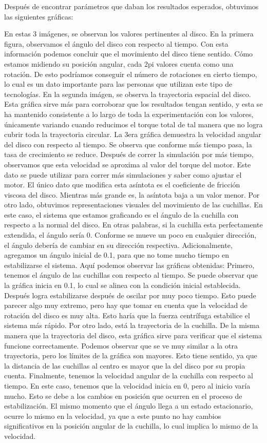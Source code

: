 \documentclass[12pt]{article}
\begin{document}
Después de encontrar parámetros que daban los resultados esperados, obtuvimos las siguientes gráficas:

En estas 3 imágenes, se observan los valores pertinentes al disco. En la primera figura, observamos el ángulo del disco con respecto al tiempo. Con esta información podemos concluir que el movimiento del disco tiene sentido. Cómo estamos midiendo su posición angular, cada 2pi valores cuenta como una rotación. De esto podríamos conseguir el número de rotaciones en cierto tiempo, lo cual es un dato importante para las personas que utilizan este tipo de tecnologías. 
En la segunda imágen, se observa la trayectoria espacial del disco. Esta gráfica sirve más para corroborar que los resultados tengan sentido, y esta se ha mantenido consistente a lo largo de toda la experimentación con los valores, únicamente variando cuando reducimos el torque total de tal manera que no logra cubrir toda la trayectoria circular.
La 3era gráfica demuestra la velocidad angular del disco con respecto al tiempo. Se observa que conforme más tiempo pasa, la tasa de crecimiento se reduce. Después de correr la simulación por más tiempo, observamos que esta velocidad se aproxima al valor del torque del motor. Este dato se puede utilizar para correr más simulaciones y saber como ajustar el motor. El único dato que modifica esta asíntota es el coeficiente de fricción viscosa del disco. Mientras más grande es, la asíntota baja a un valor menor.
	Por otro lado, obtuvimos representaciones visuales del movimiento de las cuchillas. En este caso, el sistema que estamos graficando es el ángulo de la cuchilla con respecto a la normal del disco. En otras palabras, si la cuchilla esta perfectamente extendida, el ángulo sería 0. Conforme se mueve un poco en cualquier dirección, el ángulo debería de cambiar en su dirección respectiva. Adicionalmente, agregamos un ángulo inicial de 0.1, para que no tome mucho tiempo en estabilizarse el sistema. Aquí podemos observar las gráficas obtenidas:
Primero, tenemos el ángulo de las cuchillas con respecto al tiempo. Se puede observar que la gráfica inicia en 0.1, lo cual se alinea con la condición inicial establecida. Después logra estabilizarse después de oscilar por muy poco tiempo. Esto puede parecer algo muy extremo, pero hay que tomar en cuenta que la velocidad de rotación del disco es muy alta. Esto haría que la fuerza centrífuga estabilice el sistema más rápido.
	Por otro lado, está la trayectoria de la cuchilla. De la misma manera que la trayectoria del disco, esta gráfica sirve para verificar que el sistema funcione correctamente. Podemos observar que se ve muy similar a la otra trayectoria, pero los límites de la gráfica son mayores. Esto tiene sentido, ya que la distancia de las cuchillas al centro es mayor que la del disco por su propia cuenta.
	Finalmente, tenemos la velocidad angular de la cuchilla con respecto al tiempo. En este caso, tenemos que la velocidad inicia en 0, pero al inicio varía mucho. Esto se debe a los cambios en posición que ocurren en el proceso de estabilización. El mismo momento que el ángulo llega a un estado estacionario, ocurre lo mismo en la velocidad, ya que a este punto no hay cambios significativos en la posición angular de la cuchilla, lo cual implica lo mismo de la velocidad.
\end{document}
